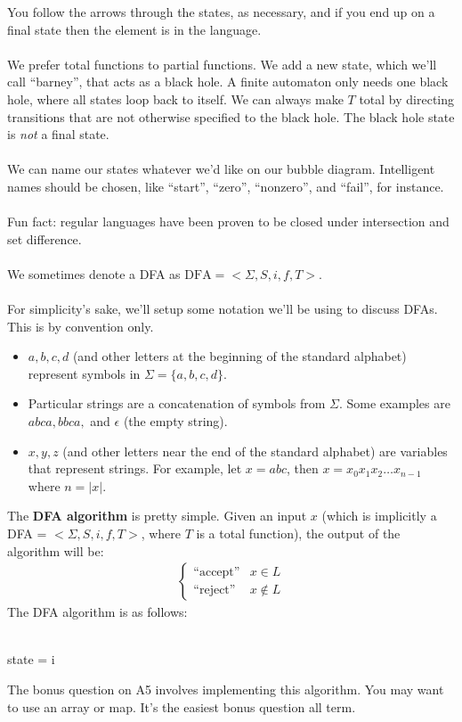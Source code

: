 \documentclass[]{article}
\theoremstyle{definition}
\newcommand{\lecture}[1]{\marginpar{{\footnotesize $\leftarrow$ \underline{#1}}}}
\begin{document}
			You follow the arrows through the states, as necessary, and if you end up on a final state then the element is in the language.
			\\ \\
			We prefer total functions to partial functions. We add a new state, which we'll call ``barney'', that acts as a black hole. A finite automaton only needs one black hole, where all states loop back to itself. We can always make $T$ total by directing transitions that are not otherwise specified to the black hole. The black hole state is \emph{not} a final state.
			\\ \\
			We can name our states whatever we'd like on our bubble diagram. Intelligent names should be chosen, like ``start'', ``zero'', ``nonzero'', and ``fail'', for instance.
			\\ \\
			Fun fact: regular languages have been proven to be closed under intersection and set difference. \lecture{February 6, 2013}
			\\ \\
			We sometimes denote a DFA as $\text{DFA} = < \Sigma, S, i, f, T >$.
			\\ \\
			For simplicity's sake, we'll setup some notation we'll be using to discuss DFAs. This is by convention only.
			\begin{itemize}
				\item $a, b, c, d$ (and other letters at the beginning of the standard alphabet) represent symbols in $\Sigma = \{a, b, c, d\}$.
				\item Particular strings are a concatenation of symbols from $\Sigma$. Some examples are $abca, bbca,$ and $\epsilon$ (the empty string).
				\item $x, y, z$ (and other letters near the end of the standard alphabet) are variables that represent strings. For example, let $x = abc$, then $x = x_0 x_1 x_2 \ldots x_{n - 1}$ where $n = |x|$.
			\end{itemize}
			The \textbf{DFA algorithm} is pretty simple. Given an input $x$ (which is implicitly a DFA = $< \Sigma, S, i, f, T >$, where $T$ is a total function), the output of the algorithm will be:
			\begin{align*}
				\begin{cases}
					\text{``accept''} & x \in L \\
					\text{``reject''} & x \not \in L
				\end{cases}
			\end{align*}
			The DFA algorithm is as follows: \\ \\
			\begin{algorithm}[H]
				state = i\;
			\end{algorithm}
			\vspace{0.5cm}
			The bonus question on A5 involves implementing this algorithm. You may want to use an array or map. It's the easiest bonus question all term.
\end{document}
